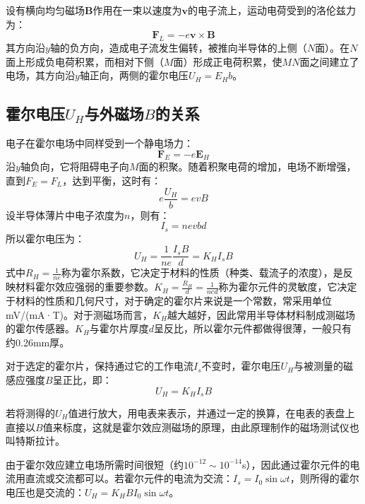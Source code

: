 设有横向均匀磁场$\mathbf{B}$作用在一束以速度为$\mathbf{v}$的电子流上，运动电荷受到的洛伦兹力为：
\begin{equation}
    \mathbf{F}_L = -e\mathbf{v} \times \mathbf{B} \label{eq:5-1}
\end{equation}
其方向沿$y$轴的负方向，造成电子流发生偏转，被推向半导体的上侧（$N$面）。在$N$面上形成负电荷积累，而相对下侧（$M$面）形成正电荷积累，使$MN$面之间建立了电场，其方向沿$y$轴正向，两侧的霍尔电压$U_H = E_H b$。

\subsection{霍尔电压$U_H$与外磁场$B$的关系}

电子在霍尔电场中同样受到一个静电场力：
\begin{equation}
    \mathbf{F}_E = -e\mathbf{E}_H
\end{equation}
沿$y$轴负向，它将阻碍电子向$M$面的积聚。随着积聚电荷的增加，电场不断增强，直到$F_E = F_L$，达到平衡，这时有：
\begin{equation}
    e\frac{U_H}{b} = evB
\end{equation}
设半导体薄片中电子浓度为$n$，则有：
\begin{equation}
    I_s = nevbd
\end{equation}
所以霍尔电压为：
\begin{equation}
    U_H = \frac{1}{ne}\frac{I_s B}{d} = K_H I_s B \label{eq:5-4}
\end{equation}
式中$R_H = \frac{1}{ne}$称为霍尔系数，它决定于材料的性质（种类、载流子的浓度），是反映材料霍尔效应强弱的重要参数。$K_H = \frac{R_H}{d} = \frac{1}{ned}$称为霍尔元件的灵敏度，它决定于材料的性质和几何尺寸，对于确定的霍尔片来说是一个常数，常采用单位 mV/(mA·T)。对于测磁场而言，$K_H$越大越好，因此常用半导体材料制成测磁场的霍尔传感器。$K_H$与霍尔片厚度$d$呈反比，所以霍尔元件都做得很薄，一般只有约0.26mm厚。

对于选定的霍尔片，保持通过它的工作电流$I_s$不变时，霍尔电压$U_H$与被测量的磁感应强度$B$呈正比，即：
\begin{equation}
    U_H = K_H I_s B \label{eq:5-5}
\end{equation}

若将测得的$U_H$值进行放大，用电表来表示，并通过一定的换算，在电表的表盘上直接以$B$值来标度，这就是霍尔效应测磁场的原理，由此原理制作的磁场测试仪也叫特斯拉计。

由于霍尔效应建立电场所需时间很短（约$10^{-12}\sim10^{-14}$s），因此通过霍尔元件的电流用直流或交流都可以。若霍尔元件的电流为交流：$I_s = I_0 \sin\omega t$，则所得的霍尔电压也是交流的：$U_H = K_H B I_0 \sin\omega t$。

